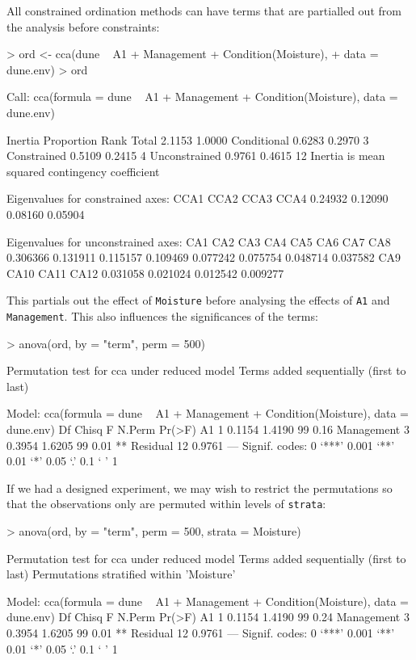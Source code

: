 \documentclass[a4paper,10pt]{amsart}
\begin{document}
All constrained ordination methods can have terms that are partialled
out from the analysis before constraints:
\begin{Schunk}
\begin{Sinput}
> ord <- cca(dune ~ A1 + Management + Condition(Moisture), 
+     data = dune.env)
> ord
\end{Sinput}
\begin{Soutput}
Call: cca(formula = dune ~ A1 + Management +
Condition(Moisture), data = dune.env)

              Inertia Proportion Rank
Total          2.1153     1.0000     
Conditional    0.6283     0.2970    3
Constrained    0.5109     0.2415    4
Unconstrained  0.9761     0.4615   12
Inertia is mean squared contingency coefficient 

Eigenvalues for constrained axes:
   CCA1    CCA2    CCA3    CCA4 
0.24932 0.12090 0.08160 0.05904 

Eigenvalues for unconstrained axes:
     CA1      CA2      CA3      CA4      CA5      CA6      CA7      CA8 
0.306366 0.131911 0.115157 0.109469 0.077242 0.075754 0.048714 0.037582 
     CA9     CA10     CA11     CA12 
0.031058 0.021024 0.012542 0.009277 
\end{Soutput}
\end{Schunk}
This partials out the effect of \texttt{Moisture} before analysing the
effects of \texttt{A1} and \texttt{Management}.  This also influences
the significances of the terms:
\begin{Schunk}
\begin{Sinput}
> anova(ord, by = "term", perm = 500)
\end{Sinput}
\begin{Soutput}
Permutation test for cca under reduced model
Terms added sequentially (first to last)

Model: cca(formula = dune ~ A1 + Management + Condition(Moisture), data = dune.env)
           Df  Chisq      F N.Perm Pr(>F)   
A1          1 0.1154 1.4190     99   0.16   
Management  3 0.3954 1.6205     99   0.01 **
Residual   12 0.9761                        
---
Signif. codes:  0 ‘***’ 0.001 ‘**’ 0.01 ‘*’ 0.05 ‘.’ 0.1 ‘ ’ 1 
\end{Soutput}
\end{Schunk}
If we had a designed experiment, we may wish to restrict the
permutations so that the observations only are permuted within levels
of \texttt{strata}:
\begin{Schunk}
\begin{Sinput}
> anova(ord, by = "term", perm = 500, strata = Moisture)
\end{Sinput}
\begin{Soutput}
Permutation test for cca under reduced model
Terms added sequentially (first to last)
Permutations stratified within 'Moisture'

Model: cca(formula = dune ~ A1 + Management + Condition(Moisture), data = dune.env)
           Df  Chisq      F N.Perm Pr(>F)   
A1          1 0.1154 1.4190     99   0.24   
Management  3 0.3954 1.6205     99   0.01 **
Residual   12 0.9761                        
---
Signif. codes:  0 ‘***’ 0.001 ‘**’ 0.01 ‘*’ 0.05 ‘.’ 0.1 ‘ ’ 1 
\end{Soutput}
\end{Schunk}

\end{document}
